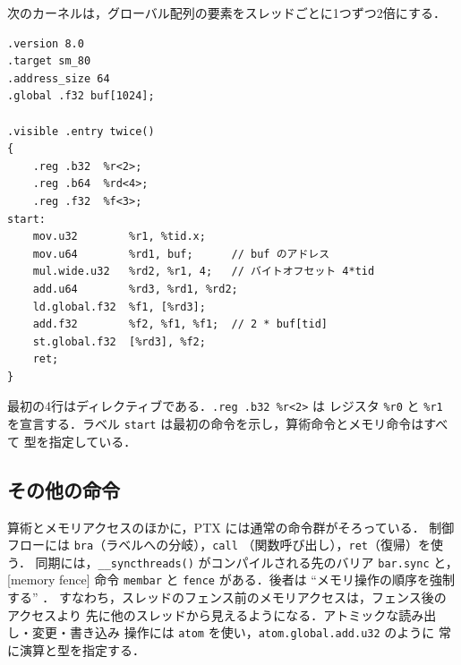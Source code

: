 \documentclass[../main.tex]{subfiles}
\begin{document}
\begin{example}
  \label{ex:l10-ptx-kernel}
  次のカーネルは，グローバル配列の要素をスレッドごとに1つずつ2倍にする．
\begin{lstlisting}[language=PTX, numbers=none]
.version 8.0
.target sm_80
.address_size 64
.global .f32 buf[1024];

.visible .entry twice()
{
    .reg .b32  %r<2>;
    .reg .b64  %rd<4>;
    .reg .f32  %f<3>;
start:
    mov.u32        %r1, %tid.x;
    mov.u64        %rd1, buf;      // buf のアドレス
    mul.wide.u32   %rd2, %r1, 4;   // バイトオフセット 4*tid
    add.u64        %rd3, %rd1, %rd2;
    ld.global.f32  %f1, [%rd3];
    add.f32        %f2, %f1, %f1;  // 2 * buf[tid]
    st.global.f32  [%rd3], %f2;
    ret;
}
\end{lstlisting}
  最初の4行はディレクティブである．\texttt{.reg .b32 \%r<2>} は
  レジスタ \texttt{\%r0} と \texttt{\%r1} を宣言する．ラベル
  \texttt{start} は最初の命令を示し，算術命令とメモリ命令はすべて
  型を指定している．
\end{example}


\subsection{その他の命令}

算術とメモリアクセスのほかに，PTX には通常の命令群がそろっている．
制御フローには \texttt{bra}（ラベルへの分岐），\texttt{call}
（関数呼び出し），\texttt{ret}（復帰）を使う．
同期には，\texttt{\_\_syncthreads()} がコンパイルされる先のバリア
\texttt{bar.sync} と，[memory fence]
命令 \texttt{membar} と \texttt{fence} がある．後者は
\enquote{メモリ操作の順序を強制する} \cite[§9.7.15.4]{nvidia2026ptx}．
すなわち，スレッドのフェンス前のメモリアクセスは，フェンス後のアクセスより
先に他のスレッドから見えるようになる．アトミックな読み出し・変更・書き込み
操作には \texttt{atom} を使い，\texttt{atom.global.add.u32} のように
常に演算と型を指定する．
\end{document}
